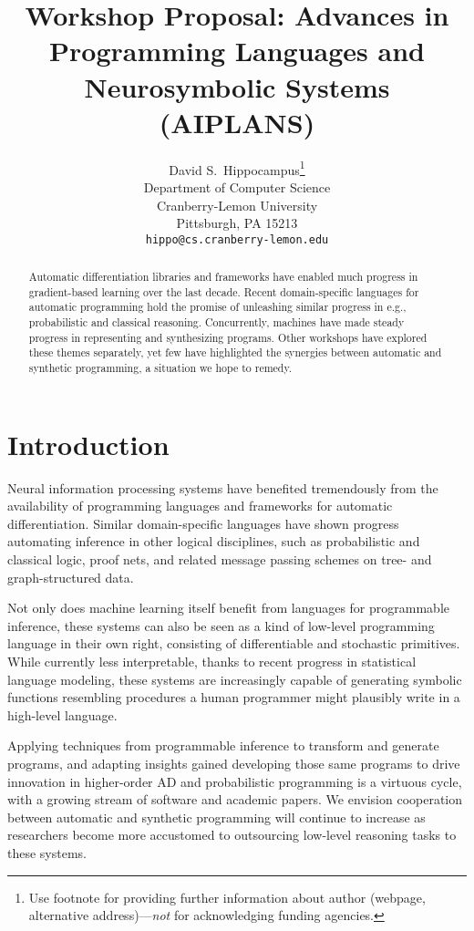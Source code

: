 \documentclass{article}
\title{Workshop Proposal: Advances in Programming Languages and Neurosymbolic Systems (AIPLANS)}
\author{%
    David S.~Hippocampus\thanks{Use footnote for providing further information
    about author (webpage, alternative address)---\emph{not} for acknowledging
    funding agencies.} \\
    Department of Computer Science\\
    Cranberry-Lemon University\\
    Pittsburgh, PA 15213 \\
    \texttt{hippo@cs.cranberry-lemon.edu} \\
}
\begin{document}
    \maketitle

    \begin{abstract}
        Automatic differentiation libraries and frameworks have enabled much progress in gradient-based learning over the last decade. Recent domain-specific languages for automatic programming hold the promise of unleashing similar progress in e.g., probabilistic and classical reasoning. Concurrently, machines have made steady progress in representing and synthesizing programs. Other workshops have explored these themes separately, yet few have highlighted the synergies between automatic and synthetic programming, a situation we hope to remedy.
    \end{abstract}

    \section{Introduction}

    Neural information processing systems have benefited tremendously from the availability of programming languages and frameworks for automatic differentiation. Similar domain-specific languages have shown progress automating inference in other logical disciplines, such as probabilistic and classical logic, proof nets, and related message passing schemes on tree- and graph-structured data.

    Not only does machine learning itself benefit from languages for programmable inference, these systems can also be seen as a kind of low-level programming language in their own right, consisting of differentiable and stochastic primitives. While currently less interpretable, thanks to recent progress in statistical language modeling, these systems are increasingly capable of generating symbolic functions resembling procedures a human programmer might plausibly write in a high-level language.

    Applying techniques from programmable inference to transform and generate programs, and adapting insights gained developing those same programs to drive innovation in higher-order AD and probabilistic programming is a virtuous cycle, with a growing stream of software and academic papers. We envision cooperation between automatic and synthetic programming will continue to increase as researchers become more accustomed to outsourcing low-level reasoning tasks to these systems.
\end{document}
